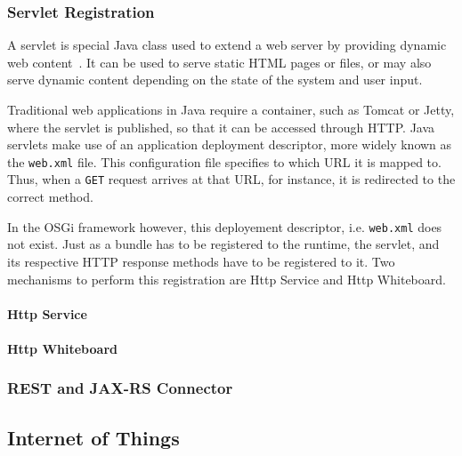 \documentclass[12pt]{article}
\begin{document}
\subsubsection{Servlet Registration}

A servlet is special Java class used to extend a web server by providing dynamic web content~\cite{servlet}. It can be used to serve static HTML pages or files, or may also serve dynamic content depending on the state of the system and user input.

Traditional web applications in Java require a container, such as Tomcat or Jetty, where the servlet is published, so that it can be accessed through HTTP. Java servlets make use of an application deployment descriptor, more widely known as the \texttt{web.xml} file. This configuration file specifies to which URL it is mapped to. Thus, when a \texttt{GET} request arrives at that URL, for instance, it is redirected to the correct method.

In the OSGi framework however, this deployement descriptor, i.e. \texttt{web.xml} does not exist. Just as a bundle has to be registered to the runtime, the servlet, and its respective HTTP response methods have to be registered to it. Two mechanisms to perform this registration are Http Service and Http Whiteboard.

\paragraph{Http Service}

\paragraph{Http Whiteboard}

\subsubsection{REST and JAX-RS Connector}

\subsection{Internet of Things}
\end{document}
